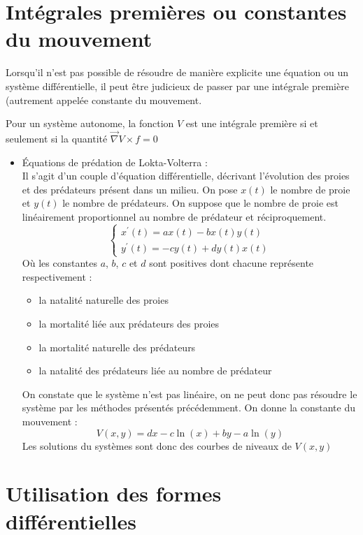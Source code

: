 \section{Intégrales premières ou constantes du mouvement}
Lorsqu'il n'est pas possible de résoudre de manière explicite une équation ou un système différentielle, il peut être judicieux de passer par une intégrale première (autrement appelée constante du mouvement.
\begin{defi}
Pour un système autonome, la fonction $V$ est une intégrale première si et seulement si la quantité $\overrightarrow{\nabla}V\times f=0$
\end{defi}



\begin{ex}
\begin{itemize}
    \item Équations de prédation de Lokta-Volterra :\\
    Il s'agit d'un couple d'équation différentielle, décrivant l'évolution des proies et des prédateurs présent dans un milieu.
    On pose $x(t)$ le nombre de proie et $y(t)$ le nombre de prédateurs.
    On suppose que le nombre de proie est linéairement proportionnel au nombre de prédateur et réciproquement.
    $$\begin{cases}
    x^{\prime}(t)=ax(t)-bx(t)y(t)\\
    y^{\prime}(t)=-cy(t)+dy(t)x(t)
    \end{cases}$$
    Où les constantes $a$, $b$, $c$ et $d$ sont positives dont chacune représente respectivement :
    \begin{itemize}
        \item la natalité naturelle des proies
        \item la mortalité liée aux prédateurs des proies
        \item la mortalité naturelle des prédateurs
        \item la natalité des prédateurs liée au nombre de prédateur
    \end{itemize}
    On constate que le système n'est pas linéaire, on ne peut donc pas résoudre le système par les méthodes présentés précédemment.
    On donne la constante du mouvement :\\
    $$V(x,y)=dx-c\ln(x)+by-a\ln(y)$$
    Les solutions du systèmes sont donc des courbes de niveaux de $V(x,y)$
\end{itemize}
\end{ex}
\section{Utilisation des formes différentielles}
